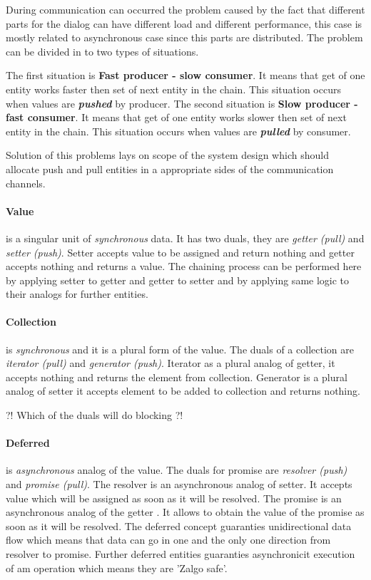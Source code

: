 During communication can occurred the problem caused by the fact that different parts for the dialog can have different load and different performance, this case is mostly related to asynchronous  case since this parts are distributed. The problem can be divided in to two types of situations.

The first situation is \textbf{Fast producer - slow consumer}. It means that get of one entity works faster then set of next entity in the chain. This situation occurs when values are \textbf{\textit{pushed}} by producer.
The second situation is \textbf{Slow producer - fast consumer}. It means that get of one entity works slower then set of next entity in the chain. This situation occurs when values are \textbf{\textit{pulled}} by consumer. 

Solution of  this problems lays on scope of the system design which should allocate push and pull entities in a appropriate sides of the communication channels.


\paragraph{Value} is a singular unit of \textit{synchronous} data. It has two duals, they are \textit{getter (pull)} and \textit{setter (push)}. Setter accepts value to be assigned and return nothing and getter accepts nothing and returns a value. The chaining process  can be performed here by applying setter to getter and getter to setter and by applying same logic to their analogs for further  entities.

\paragraph{Collection} is \textit{synchronous} and it is a plural form of the value. The duals of a collection are \textit{iterator (pull)} and \textit{generator (push)}. Iterator as a plural analog of getter, it accepts nothing and returns the element from collection. Generator is a plural analog of setter it accepts element to be added to collection and returns nothing.


?! Which of the duals will do blocking ?!


\paragraph{Deferred} is \textit{asynchronous} analog of the value. The duals for promise are \textit{resolver (push)} and \textit{promise (pull)}. The resolver is an asynchronous analog of setter. It  accepts value which will be assigned as soon as it will be resolved. The promise is an asynchronous analog of the getter . It allows to obtain the value of the promise as soon as it will be resolved. The deferred concept guaranties unidirectional data flow which means that data can go in one and the only one direction from resolver to promise. Further deferred entities guaranties asynchronicit execution of am operation which means they are 'Zalgo safe'\cite{asyncPerformance}.

